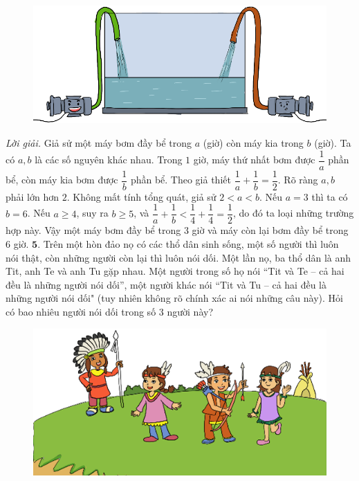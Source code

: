 \begin{multicols}{2}
\begin{figure}[H]
		\vspace*{-5pt}
		\centering
		\captionsetup{labelformat= empty, justification=centering}
		\includegraphics[width= 0.9\linewidth]{b4}
		\vspace*{-10pt}
	\end{figure}
	\textit{Lời giải.} 	Giả sử một máy bơm đầy bể trong $a$ (giờ) còn máy kia trong $b$ (giờ). Ta có $a,b$ là các số nguyên khác nhau. Trong $1$ giờ, máy thứ nhất bơm được $\dfrac{1}{a}$ phần bể, còn máy kia bơm được $\dfrac{1}{b}$ phần bể. Theo giả thiết $\dfrac{1}{a}+\dfrac{1}{b}= \dfrac{1}{2}$.
	\vskip 0.1cm
	Rõ ràng $a,b$ phải lớn hơn $2$. Không mất tính tổng quát, giả sử $2<a<b$. 
	\vskip 0.1cm
	Nếu $a = 3$ thì ta có $b = 6$.
	\vskip 0.1cm
	Nếu $a \ge 4$, suy ra $b \ge 5$, và $\dfrac{1}{a} + \dfrac{1}{b} < \dfrac{1}{4} + \dfrac{1}{4} = \dfrac{1}{2}$, do đó ta loại những trường hợp này.
	\vskip 0.1cm
	Vậy một máy bơm đầy bể trong $3$ giờ và máy còn lại bơm đầy bể trong $6$ giờ.
	\vskip 0.1cm
 	$\pmb{5.}$ Trên một hòn đảo nọ có các thổ dân sinh sống, một số người thì luôn nói thật, còn những người còn lại thì luôn nói dối. Một lần nọ, ba thổ dân là anh Tit, anh Te và anh Tu gặp nhau. Một người trong số họ nói ``Tit và Te -- cả hai đều là những  người nói dối'', một người khác nói ``Tit và Tu -- cả hai đều là những người nói dối" (tuy nhiên không rõ chính xác ai nói những câu này). Hỏi có bao nhiêu người nói dối trong số $3$ người này?
	\begin{figure}[H]
		\vspace*{-5pt}
		\centering
		\captionsetup{labelformat= empty, justification=centering}
		\includegraphics[width= 1\linewidth]{b5}

\end{figure}
\end{multicols}
